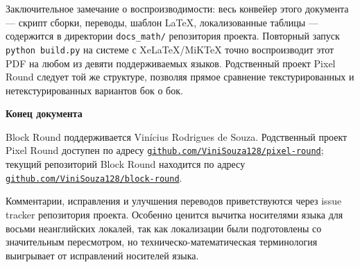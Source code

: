 \documentclass[12pt,a4paper]{scrartcl}
\newcommand{\code}[1]{\texttt{\small #1}}
\newcommand{\biblink}[2]{\href{#1}{\nolinkurl{#2}}}
\begin{document}
Заключительное замечание о воспроизводимости: весь конвейер этого документа --- скрипт сборки, переводы, шаблон LaTeX, локализованные таблицы --- содержится в директории \code{docs\_math/} репозитория проекта. Повторный запуск \code{python build.py} на системе с XeLaTeX/MiKTeX точно воспроизводит этот PDF на любом из девяти поддерживаемых языков. Родственный проект Pixel Round следует той же структуре, позволяя прямое сравнение текстурированных и нетекстурированных вариантов бок о бок.

\vspace{1.2em}

\begin{center}
{\sffamily\bfseries\color{accent}Конец документа}
\end{center}

\vspace{0.6em}

Block Round поддерживается Vinícius Rodrigues de Souza. Родственный проект Pixel Round доступен по адресу \biblink{https://github.com/ViniSouza128/pixel-round}{github.com/ViniSouza128/pixel-round}; текущий репозиторий Block Round находится по адресу \biblink{https://github.com/ViniSouza128/block-round}{github.com/ViniSouza128/block-round}.

Комментарии, исправления и улучшения переводов приветствуются через issue tracker репозитория проекта. Особенно ценится вычитка носителями языка для восьми неанглийских локалей, так как локализации были подготовлены со значительным пересмотром, но техническо-математическая терминология выигрывает от исправлений носителей языка.
\end{document}
